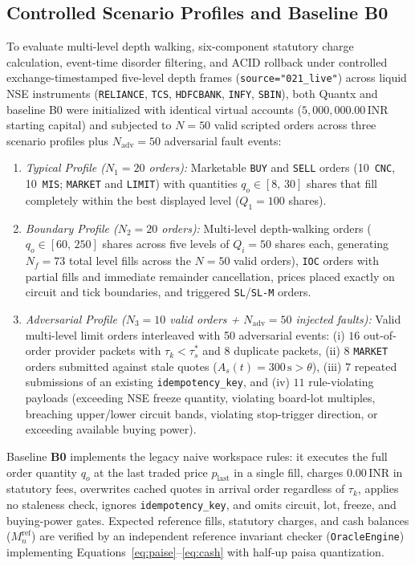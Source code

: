 \documentclass[journal,onecolumn,10pt]{IEEEtran}
\newcommand{\thinunit}[2]{#1\,\text{#2}}
\begin{document}
\subsection{Controlled Scenario Profiles and Baseline B0}
To evaluate multi-level depth walking, six-component statutory charge calculation, event-time disorder filtering, and ACID rollback under controlled exchange-timestamped five-level depth frames (\texttt{source="021\_live"}) across liquid NSE instruments (\texttt{RELIANCE}, \texttt{TCS}, \texttt{HDFCBANK}, \texttt{INFY}, \texttt{SBIN}), both Quantx and baseline B0 were initialized with identical virtual accounts ($\thinunit{5{,}000{,}000.00}{INR}$ starting capital) and subjected to $N=50$ valid scripted orders across three scenario profiles plus $N_{\mathrm{adv}}=50$ adversarial fault events:
\begin{enumerate}
  \item \emph{Typical Profile ($N_1=20$ orders):} Marketable \texttt{BUY} and \texttt{SELL} orders (10~\texttt{CNC}, 10~\texttt{MIS}; \texttt{MARKET} and \texttt{LIMIT}) with quantities $q_o \in [8,\,30]$ shares that fill completely within the best displayed level ($Q_1=100$ shares).
  \item \emph{Boundary Profile ($N_2=20$ orders):} Multi-level depth-walking orders ($q_o \in [60,\,250]$ shares across five levels of $Q_i=50$ shares each, generating $N_f=73$ total level fills across the $N=50$ valid orders), \texttt{IOC} orders with partial fills and immediate remainder cancellation, prices placed exactly on circuit and tick boundaries, and triggered \texttt{SL}/\texttt{SL-M} orders.
  \item \emph{Adversarial Profile ($N_3=10$ valid orders + $N_{\mathrm{adv}}=50$ injected faults):} Valid multi-level limit orders interleaved with 50 adversarial events: (i) $16$ out-of-order provider packets with $\tau_k < \tau^{*}_s$ and $8$ duplicate packets, (ii) $8$ \texttt{MARKET} orders submitted against stale quotes ($A_s(t) = \thinunit{300}{s} > \theta$), (iii) $7$ repeated submissions of an existing \texttt{idempotency\_key}, and (iv) $11$ rule-violating payloads (exceeding NSE freeze quantity, violating board-lot multiples, breaching upper/lower circuit bands, violating stop-trigger direction, or exceeding available buying power).
\end{enumerate}

Baseline \textbf{B0} implements the legacy naive workspace rules: it executes the full order quantity $q_o$ at the last traded price $p_{\mathrm{last}}$ in a single fill, charges $\thinunit{0.00}{INR}$ in statutory fees, overwrites cached quotes in arrival order regardless of $\tau_k$, applies no staleness check, ignores \texttt{idempotency\_key}, and omits circuit, lot, freeze, and buying-power gates. Expected reference fills, statutory charges, and cash balances ($M^{\mathrm{ref}}_n$) are verified by an independent reference invariant checker (\texttt{OracleEngine}) implementing Equations~\eqref{eq:paise}--\eqref{eq:cash} with half-up paisa quantization.
\end{document}
